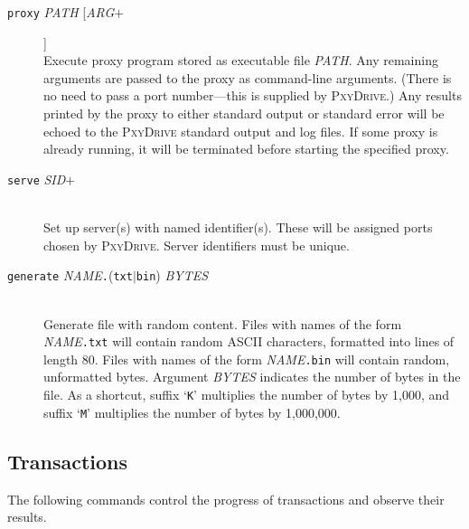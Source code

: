 \documentclass[11pt]{article}
\newcommand{\pxydrive}{\textsc{PxyDrive}}
\begin{document}
\begin{description}
\item[\texttt{proxy} {\it PATH} [\textit{ARG}$+$]] $\;$ \\
    Execute proxy program stored as executable file {\it PATH}\@.
    Any remaining arguments are passed to the proxy as command-line
    arguments.  (There is no need to pass a port number---this is
    supplied by \pxydrive{}.)
    Any results printed by the proxy to either standard
    output or standard error will be echoed to the \pxydrive{}
    standard output
    and log files.  If some proxy is already running, it will be
    terminated before starting the specified proxy.

\item[\texttt{serve} \textit{SID}$+$] $\;$ \\
    Set up server(s) with named identifier(s).  These will be assigned
    ports chosen by \pxydrive{}.  Server identifiers must be unique.

\item[\texttt{generate} \textit{NAME}\texttt{.}(\texttt{txt}$|$\texttt{bin}) \textit{BYTES}] $\;$ \\
    Generate file with random content.  
    Files with names of the form \textit{NAME}\texttt{.txt} will
    contain random ASCII characters, formatted into lines of length
    80.
    Files with names of the form \textit{NAME}\texttt{.bin} will
    contain random, unformatted bytes.
    Argument \textit{BYTES} indicates the number of bytes in the
    file.  As a shortcut, suffix `\texttt{K}' multiplies the number of
    bytes by 1,000, and suffix `\texttt{M}' multiplies the number of
    bytes by 1,000,000.
\end{description}

\subsection*{Transactions}

The following commands control the progress of transactions and
observe their results.
\end{document}
